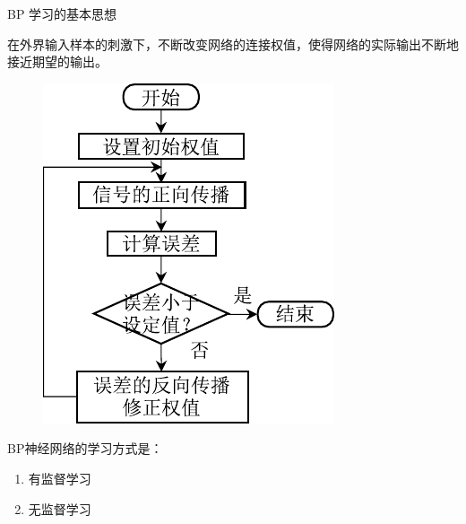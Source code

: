 \begin{note}
    BP 学习的基本思想

    在外界输入样本的刺激下，不断改变网络的连接权值，使得网络的实际输出不断地接近期望的输出。
    \begin{figure}[htbp]
        \centering
        \includegraphics{image/BP学习的基本思想.pdf}
    \end{figure}
\end{note}
\begin{example}
    BP神经网络的学习方式是：
    \begin{enumerate}[A]
        \item \textcolor{main1}{有监督学习}
        \item 无监督学习
    \end{enumerate}
\end{example}
